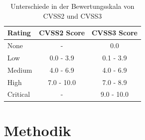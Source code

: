 \documentclass[a4paper]{book}
\begin{document}
\begin{large}
\begin{onehalfspace}
\begin{table}[ht]
\centering
\begin{tabular}{lcc}
Rating   & \multicolumn{1}{l}{CVSS2 Score} & \multicolumn{1}{l}{CVSS3 Score} \\ \hline
None     & -                               & 0.0                             \\
Low      & 0.0 - 3.9                       & 0.1 - 3.9                       \\
Medium   & 4.0 - 6.9                       & 4.0 - 6.9                       \\
High     & 7.0 - 10.0                      & 7.0 - 8.9                       \\
Critical & -                               & 9.0 - 10.0                     
\end{tabular}
\caption{Unterschiede in der Bewertungsskala von CVSS2 und CVSS3 \cite{CVSS2.2007, CVSS3.2015}}
\label{tab:CVSS dif}
\end{table}
 
\end{onehalfspace}



\chapter{Methodik}
\label{methods}


\end{large}
\end{document}
